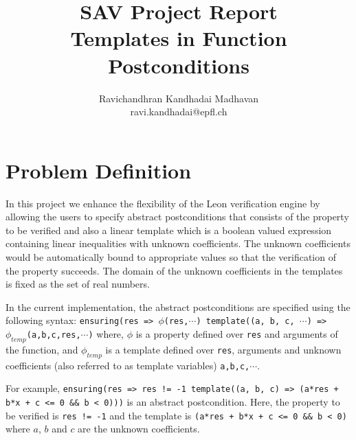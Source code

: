 \documentclass[a4paper,10pt]{article}
\begin{document}
\title{SAV Project Report \\ Templates in Function Postconditions}
\author{Ravichandhran Kandhadai Madhavan \\ ravi.kandhadai@epfl.ch}
\maketitle

\newcommand{\dash}[1]{\overline{#1}}
\newcommand{\progst}[1]{\texttt{#1}}
\newcommand{\temp}{\mathit{\phi_{temp}}}
\newcommand{\post}{\mathit{\phi_{post}}}
\newcommand{\body}{\mathit{\phi_{body}}}
\newcommand{\zerovec}{\mathbf{0}}
\newcommand{\Body}[1]{\mathit{Body(#1)}}
\newcommand{\Post}[1]{\mathit{Post(#1)}}
\newcommand{\Temp}[1]{\mathit{Temp(#1)}}



\section{Problem Definition}

In this project we enhance the flexibility of the Leon verification engine by allowing the users to specify abstract postconditions that consists of the property to be verified and also a linear template which is a boolean valued expression containing linear inequalities with unknown coefficients.
The unknown coefficients would be automatically bound to appropriate values so that the verification of the property succeeds.
The domain of the unknown coefficients in the templates is fixed as the set of real numbers.

In the current implementation, the abstract postconditions are specified using the following syntax: \progst{ensuring(res => $\phi$(res,$\cdots$)  template((a, b, c, $\cdots$) => $\temp$(a,b,c,res,$\cdots$)} where, $\phi$ is a property defined over \progst{res} and arguments of the function, and $\temp$ is a template defined over \progst{res}, arguments and unknown coefficients (also referred to as template variables) \progst{a,b,c,$\cdots$}.

For example, \progst{ensuring(res => res != -1 template((a, b, c) => (a*res + b*x + c <= 0 \&\& b < 0)))} is an abstract postcondition. Here, the property to be verified is \progst{res != -1} and the template is \progst{(a*res + b*x + c <= 0 \&\& b < 0)} where $a$, $b$ and $c$ are the unknown coefficients.
\end{document}
